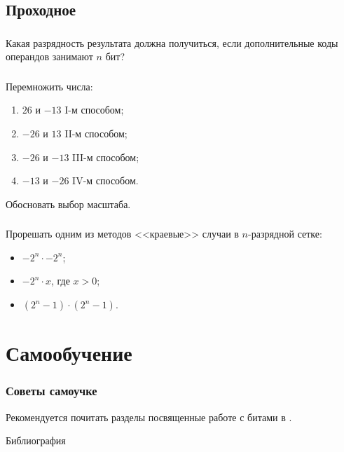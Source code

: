 \subsection{Проходное}

\begin{frame}
    \frametitle{\TaskSimpleNumber}
    Какая разрядность результата должна получиться, если дополнительные коды операндов занимают $n$ бит?
\end{frame}

\begin{frame}
    \frametitle{\TaskSimpleNumber}

    Перемножить числа:

    \begin{enumerate}
        \item $26$ и $-13$ I-м способом; 
        \item $-26$ и $13$ II-м способом; 
        \item $-26$ и $-13$ III-м способом; 
        \item $-13$ и $-26$ IV-м способом.
    \end{enumerate}
    
    Обосновать выбор масштаба.
\end{frame}

\begin{frame}
    \frametitle{\TaskSimpleNumber}
    Прорешать одним из методов <<краевые>> случаи в $n$-разрядной сетке:
    \begin{itemize}
        \item $-2^n\cdot -2^n$;
        \item $-2^n\cdot x$, где $x>0$;
        \item $(2^n-1)\cdot(2^n-1)$.
    \end{itemize}
\end{frame}

\begin{frame}
    \frametitle{\TaskSimpleNumber}
    
\end{frame}

\section{Самообучение}

\begin{frame}
    \frametitle{Советы самоучке}
    
    Рекомендуется почитать разделы посвященные работе с битами в \cite{bib:warren:algTriks}.
\end{frame}

\begin{frame}[allowframebreaks]{Библиография}
    
    
\end{frame}

